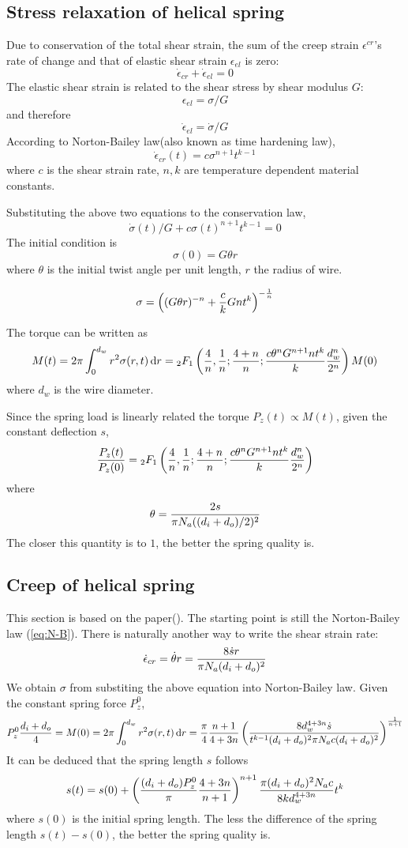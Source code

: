 \documentclass[10pt]{article}
\begin{document}
\subsection{Stress relaxation of helical spring}
\label{sec:Relaxation}

Due to conservation of the total shear strain, the sum of the creep strain $\epsilon^{cr}$'s rate of change and that of elastic shear strain $\epsilon_{el}$ is zero:
\[
\dot{\epsilon}_{cr} + \dot{\epsilon}_{el} = 0
\]
The elastic shear strain is related to the shear stress by shear modulus $G$:
\[
\epsilon_{el} = \sigma/G
\]
and therefore
\[
\dot{\epsilon}_{el} = \dot{\sigma}/G
\]
According to Norton-Bailey law(also known as time hardening law),
\begin{equation} \label{eq:N-B}
\dot{\epsilon}_{cr}(t)=c\sigma^{n+1} t^{k-1}
\end{equation}
where $c$ is the shear strain rate, $n,k$ are temperature dependent material constants.

Substituting the above two equations to the conservation law,
\begin{equation} \label{eq:diff}
\dot{\sigma}(t)/G+c\sigma(t)^{n+1} t^{k-1}=0
\end{equation}
The initial condition is
\[
\sigma (0) = G\theta r
\]
where $\theta$ is the initial twist angle per unit length, $r$ the radius of wire.

\[
\sigma = \left( (G\theta r)^{-n} + {c\over k} Gnt^k \right)^{-{1\over n}}
\]

The torque can be written as
\[
M(t) = 2\pi \int_0^{d_w} r^2 \sigma(r,t)\,\mathrm{d} r ={}_{2}F_1 \left( {4\over n},{1\over n};{4+n\over n};{c\theta^n G^{n+1} n t^k\over k} {d_w^n\over 2^n}\right) M(0)
\]
where $d_w$ is the wire diameter.

Since the spring load is linearly related the torque $P_z(t)\propto M(t)$, given the constant deflection $s$,
\[
{P_z(t)\over P_z(0)} = {}_{2}F_1 \left( {4\over n},{1\over n};{4+n\over n};{c\theta^n G^{n+1} n t^k\over k} {d_w^n\over 2^n}\right)
\]
where
\[
\theta = {2s\over \pi N_a ((d_i+d_o)/2)^2}
\]
The closer this quantity is to $1$, the better the spring quality is.

\subsection{Creep of helical spring}
This section is based on the paper(\cite{Ko2014}). The starting point is still the Norton-Bailey law (\ref{eq:N-B}). There is naturally another way to write the shear strain rate:
\[
\dot{\epsilon}_{cr} = \dot{\theta} r = {8\dot{s} r\over \pi N_a (d_i+d_o)^2}
\]
We obtain $\sigma$ from substiting the above equation into Norton-Bailey law. Given the constant spring force $P_z^0$,
\[
P_z^0{d_i+d_o\over 4}=M(0)=2\pi\int_0^{d_w} r^2 \sigma(r,t)\,\mathrm{d} r
={\pi\over 4}{n+1\over 4+3n}\left( {8d_w^{4+3n}\dot{s} \over t^{k-1} (d_i+d_o)^2 \pi N_a c (d_i+d_o)^2} \right)^{{1\over n+1}}
\]
It can be deduced that the spring length $s$ follows
\[
s(t) = s(0) + \left( {(d_i+d_o)P_z^0\over \pi}{4+3n\over n+1} \right)^{n+1} {\pi (d_i+d_o)^2 N_a c\over 8kd_w^{4+3n}} t^k
\]
where $s(0)$ is the initial spring length. The less the difference of the spring length $s(t)-s(0)$, the better the spring quality is.
 
\end{document}
